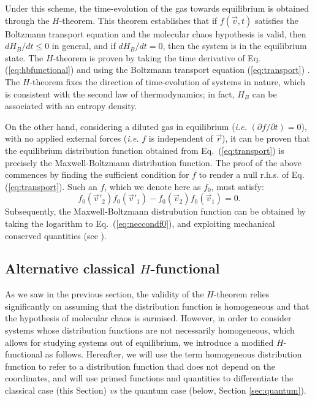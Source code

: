 Under this scheme, the time-evolution of the gas towards equilibrium is obtained through the
$H$-theorem. This theorem establishes that if $f(\vec{v},t)$ satisfies the Boltzmann
transport equation and the molecular chaos hypothesis is valid, then
$dH_B/dt\leq0$ in general, and if $dH_B/dt=0$, then the system is in the equilibrium state.
The $H$-theorem is proven by taking the time derivative
of Eq. (\ref{eq:hbfunctional}) and using the Boltzmann transport equation
(\ref{eq:transport}) \cite{bib:huang}. The $H$-theorem fixes the direction of time-evolution
of systems in nature, which is consistent with the second law of thermodynamics; in fact,
$H_B$ can be associated with an entropy density.

On the other hand, considering a diluted gas in equilibrium (\textit{i.e.}
$(\partial f/\partial t)=0$),
with no applied external forces (\textit{i.e.} $f$ is independent of $\vec r$), 
it can be proven that the equilibrium distribution function obtained from
Eq.~(\ref{eq:transport}) is precisely the Maxwell-Boltzmann
distribution function. The proof of the above commences by finding the sufficient
condition for $f$ to render a null r.h.s. of Eq. (\ref{eq:transport}). Such an
$f$, which we denote here as $f_0$, must satisfy:
%
\begin{equation}\label{eq:neccondf0}
    f_0(\vec{v}'_2)f_0(\vec{v}'_1)- f_0(\vec{v}_2)f_0(\vec{v}_1)=0.
\end{equation}
%
Subsequently, the Maxwell-Boltzmann distrubution function can be obtained by
taking the logarithm to Eq.~(\ref{eq:neccondf0}), and exploiting mechanical
conserved quantities (see \cite[ch. 4.2]{bib:huang}).

\subsection{Alternative classical $H$-functional}

As we saw in the previous section,
the validity of the $H$-theorem relies significantly on assuming
that the distribution function is homogeneous and that the hypothesis of
molecular chaos is surmised. However, in order to consider systems whose
distribution functions are not necessarily homogeneous, which
allows for studying systems out of equilibrium,
we introduce a modified $H$-functional as follows. Hereafter, we will
use the term homogeneous distribution function to refer to a distribution
function thad does not depend on the coordinates, and will use primed functions
and quantities to differentiate the classical case (this Section) \textit{vs} the quantum
case (below, Section \ref{sec:quantum}).

